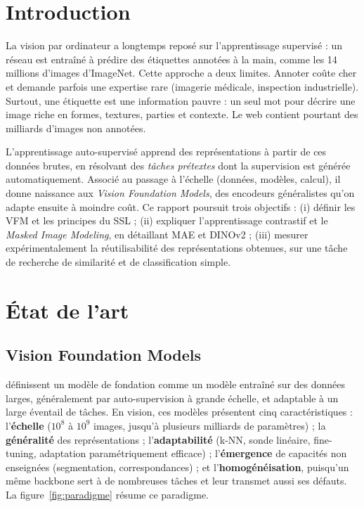 \documentclass[11pt,a4paper]{article}
\begin{document}
\section{Introduction}
La vision par ordinateur a longtemps reposé sur l'apprentissage supervisé : un réseau est entraîné à prédire des étiquettes annotées à la main, comme les 14 millions d'images d'ImageNet. Cette approche a deux limites. Annoter coûte cher et demande parfois une expertise rare (imagerie médicale, inspection industrielle). Surtout, une étiquette est une information pauvre : un seul mot pour décrire une image riche en formes, textures, parties et contexte. Le web contient pourtant des milliards d'images non annotées.

L'apprentissage auto-supervisé apprend des représentations à partir de ces données brutes, en résolvant des \emph{tâches prétextes} dont la supervision est générée automatiquement. Associé au passage à l'échelle (données, modèles, calcul), il donne naissance aux \emph{Vision Foundation Models}, des encodeurs généralistes qu'on adapte ensuite à moindre coût. Ce rapport poursuit trois objectifs : (i) définir les VFM et les principes du SSL ; (ii) expliquer l'apprentissage contrastif et le \emph{Masked Image Modeling}, en détaillant MAE et DINOv2 ; (iii) mesurer expérimentalement la réutilisabilité des représentations obtenues, sur une tâche de recherche de similarité et de classification simple.

\section{État de l'art}
\subsection{Vision Foundation Models}
\citet{bommasani2021foundation} définissent un modèle de fondation comme un modèle entraîné sur des données larges, généralement par auto-supervision à grande échelle, et adaptable à un large éventail de tâches. En vision, ces modèles présentent cinq caractéristiques : l'\textbf{échelle} ($10^8$ à $10^9$ images, jusqu'à plusieurs milliards de paramètres) ; la \textbf{généralité} des représentations ; l'\textbf{adaptabilité} (k-NN, sonde linéaire, fine-tuning, adaptation paramétriquement efficace) ; l'\textbf{émergence} de capacités non enseignées (segmentation, correspondances) ; et l'\textbf{homogénéisation}, puisqu'un même backbone sert à de nombreuses tâches et leur transmet aussi ses défauts. La figure~\ref{fig:paradigme} résume ce paradigme.
\end{document}
